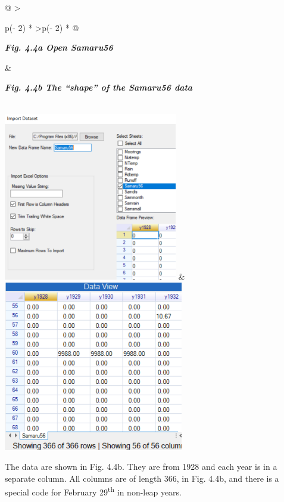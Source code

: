 \documentclass[
  letterpaper,
  DIV=11,
  numbers=noendperiod]{scrreprt}
\begin{document}
\begin{longtable}[]{@{}
  >{\raggedright\arraybackslash}p{(\columnwidth - 2\tabcolsep) * }
  >{\raggedleft\arraybackslash}p{(\columnwidth - 2\tabcolsep) * }@{}}
\toprule\noalign{}
\begin{minipage}[b]{\linewidth}\raggedright
\textbf{\emph{Fig. 4.4a Open Samaru56}}
\end{minipage} & \begin{minipage}[b]{\linewidth}\raggedleft
\textbf{\emph{Fig. 4.4b The ``shape'' of the Samaru56 data}}
\end{minipage} \\
\midrule\noalign{}
\endhead
\bottomrule\noalign{}
\endlastfoot
\includegraphics[width=2.98895in,height=\textheight]{figures/Fig4.4a.png}
&
\includegraphics[width=3.08981in,height=2.92662in]{figures/Fig4.4b.png} \\
\end{longtable}

The data are shown in Fig. 4.4b. They are from 1928 and each year is in
a separate column. All columns are of length 366, in Fig. 4.4b, and
there is a special code for February 29\textsuperscript{th} in non-leap
years.
\end{document}
